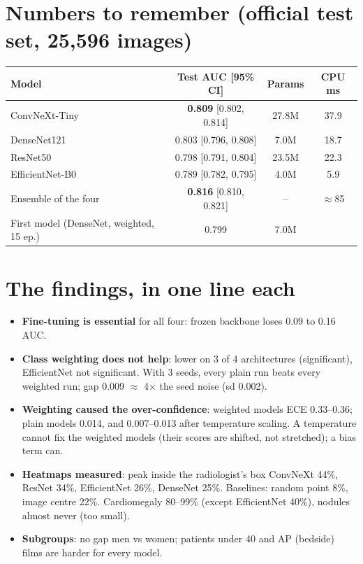 \documentclass[11pt,a4paper]{article}
\begin{document}
\section*{Numbers to remember (official test set, 25,596 images)}
\begin{tabular}{@{}lccc@{}}
\toprule
Model & Test AUC [95\% CI] & Params & CPU ms \\
\midrule
ConvNeXt-Tiny & \textbf{0.809} [0.802, 0.814] & 27.8M & 37.9 \\
DenseNet121 & 0.803 [0.796, 0.808] & 7.0M & 18.7 \\
ResNet50 & 0.798 [0.791, 0.804] & 23.5M & 22.3 \\
EfficientNet-B0 & 0.789 [0.782, 0.795] & 4.0M & 5.9 \\
Ensemble of the four & \textbf{0.816} [0.810, 0.821] & -- & $\approx$85 \\
\midrule
First model (DenseNet, weighted, 15 ep.) & 0.799 & 7.0M & \\
\bottomrule
\end{tabular}

\section*{The findings, in one line each}
\begin{itemize}
  \item \textbf{Fine-tuning is essential} for all four: frozen backbone loses 0.09 to 0.16 AUC.
  \item \textbf{Class weighting does not help}: lower on 3 of 4 architectures (significant), EfficientNet not significant. With 3 seeds, every plain run beats every weighted run; gap 0.009 $\approx$ 4$\times$ the seed noise (sd 0.002).
  \item \textbf{Weighting caused the over-confidence}: weighted models ECE 0.33--0.36; plain models 0.014, and 0.007--0.013 after temperature scaling. A temperature cannot fix the weighted models (their scores are shifted, not stretched); a bias term can.
  \item \textbf{Heatmaps measured}: peak inside the radiologist's box ConvNeXt 44\%, ResNet 34\%, EfficientNet 26\%, DenseNet 25\%. Baselines: random point 8\%, image centre 22\%. Cardiomegaly 80--99\% (except EfficientNet 40\%), nodules almost never (too small).
  \item \textbf{Subgroups}: no gap men vs women; patients under 40 and AP (bedside) films are harder for every model.
\end{itemize}
\end{document}
